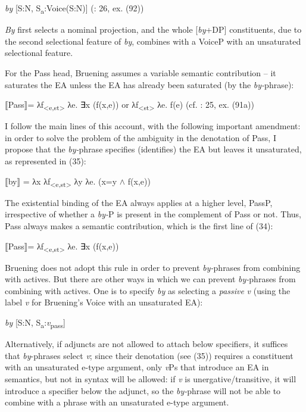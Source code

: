 \documentclass[output=paper]{langsci/langscibook}
\begin{document}
\ea%
    \label{ex:giurgea:33}
    \textit{by} [S:N, S\textsubscript{a}:Voice(S:N)]  (\citealt{Bruening2012}: 26, ex. (92))
\z

\textit{By} first selects a nominal projection, and the whole [\textit{by}+DP] constituents, due to the second selectional feature of \textit{by}, combines with a VoiceP with an unsaturated selectional feature. 

For the Pass head, Bruening assumes a variable semantic contribution – it saturates the EA unless the EA has already been saturated (by the \textit{by-}phrase):

\ea%
    \label{ex:giurgea:34}
    ⟦Pass⟧= λf\textsubscript{<e,st>} λe. ∃x (f(x,e))  or  λf\textsubscript{<st>} λe. f(e)   (cf. \citealt{Bruening2012}: 25, ex. (91a))
\z
    
I follow the main lines of this account, with the following important amendment: in order to solve the problem of the ambiguity in the denotation of Pass, I propose that the \textit{by-}phrase specifies (identifies) the EA but leaves it unsaturated, as represented in (35):

\ea%
    \label{ex:giurgea:35}
    ⟦by⟧ = λx λf\textsubscript{<e,st>} λy λe. (x=y $\wedge$ f(x,e))
\z

The existential binding of the EA always applies at a higher level, PassP, irrespective of whether a \textit{by-}P is present in the complement of Pass or not. Thus, Pass always makes a semantic contribution, which is the first line of (34):

\ea%
    \label{ex:giurgea:36}
⟦Pass⟧= λf\textsubscript{<e,st>} λe. ∃x (f(x,e))
\z


Bruening does not adopt this rule in order to prevent \textit{by-}phrases from combining with actives. But there are other ways in which we can prevent \textit{by-}phrases from combining with actives. One is to specify \textit{by} as selecting a \textit{passive} \textit{v} (using the label \textit{v} for Bruening’s Voice with an unsaturated EA):

\ea%
    \label{ex:giurgea:37}
    \textit{by} [S:N, S\textsubscript{a}:\textit{v}\textsubscript{pass}]
\z

Alternatively, if adjuncts are not allowed to attach below specifiers, it suffices that \textit{by}{}-phrases select \textit{v}; since their denotation (see (35)) requires a constituent with an unsaturated e-type argument, only \textit{v}Ps that introduce an EA in semantics, but not in syntax will be allowed: if \textit{v} is unergative/transitive, it will introduce a specifier below the adjunct, so the \textit{by-}phrase will not be able to combine with a phrase with an unsaturated e-type argument.
\end{document}
